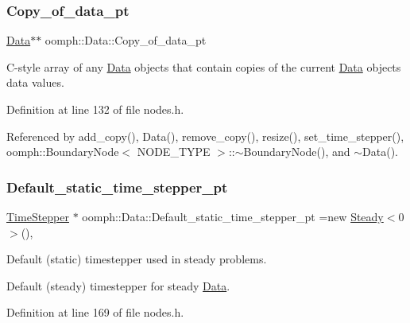 \subsubsection{\texorpdfstring{Copy\+\_\+of\+\_\+data\+\_\+pt}{Copy\_of\_data\_pt}}
{\footnotesize\ttfamily \hyperlink{classoomph_1_1Data}{Data}$\ast$$\ast$ oomph\+::\+Data\+::\+Copy\+\_\+of\+\_\+data\+\_\+pt\hspace{0.3cm}{\ttfamily [protected]}}



C-\/style array of any \hyperlink{classoomph_1_1Data}{Data} objects that contain copies of the current \hyperlink{classoomph_1_1Data}{Data} object\textquotesingle{}s data values. 



Definition at line 132 of file nodes.\+h.



Referenced by add\+\_\+copy(), Data(), remove\+\_\+copy(), resize(), set\+\_\+time\+\_\+stepper(), oomph\+::\+Boundary\+Node$<$ N\+O\+D\+E\+\_\+\+T\+Y\+P\+E $>$\+::$\sim$\+Boundary\+Node(), and $\sim$\+Data().

\mbox{\label{classoomph_1_1Data_a05936a16f5fca1612ad3f47b4e87d267}} 
\subsubsection{\texorpdfstring{Default\+\_\+static\+\_\+time\+\_\+stepper\+\_\+pt}{Default\_static\_time\_stepper\_pt}}
{\footnotesize\ttfamily \hyperlink{classoomph_1_1TimeStepper}{Time\+Stepper} $\ast$ oomph\+::\+Data\+::\+Default\+\_\+static\+\_\+time\+\_\+stepper\+\_\+pt =new \hyperlink{classoomph_1_1Steady}{Steady}$<$0$>$()\hspace{0.3cm}{\ttfamily [static]}, {\ttfamily [protected]}}



Default (static) timestepper used in steady problems. 

Default (steady) timestepper for steady \hyperlink{classoomph_1_1Data}{Data}. 

Definition at line 169 of file nodes.\+h.



